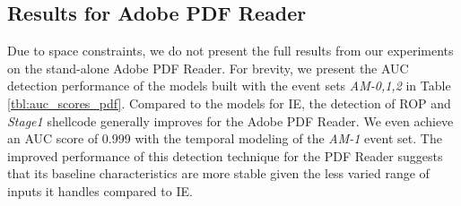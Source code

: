 \documentclass{acm_proc_article-sp}
\begin{document}
\iffalse
	\begin{figure}
	  \centering
\caption{Detection overhead in terms of IPC over different sampling granularity.}
	  \label{fig:detection_overhead}
	\end{figure}
	
	\textbf{Online detection overhead} \space\space To assess the overhead incurred by the online classification and detection of the stream of event measurements over varying sampling rates, we measure the Instructions Per Cycle (IPC) of the prototype component that performs the online classification of the measurements. From Figure \ref{fig:detection_overhead}, we observe that finer-grained sampling rates reduces the IPC of the classification code execution. Furthermore, the online classification using the temporal model shows a lower performance in terms of IPC, compared to that using the na\"{i}ve approach.
	
	\fi 


\subsection{Results for Adobe PDF Reader}
Due to space constraints, we do not present the full results from our
experiments on the stand-alone Adobe PDF Reader. For brevity, we 
present the AUC detection performance of the models built with the 
event sets \textit{AM-0,1,2} in Table \ref{tbl:auc_scores_pdf}. 
Compared to the models for IE, the detection of ROP and \textit{Stage1} 
shellcode generally improves for the Adobe PDF Reader. We even achieve 
an AUC score of 0.999 with the temporal modeling of the \textit{AM-1} 
event set.  The improved performance of this detection technique for 
the PDF Reader suggests that its baseline characteristics are more 
stable given the less varied range of inputs it handles compared to IE.


\begin{table}
\caption{AUC scores for stand-alone Adobe PDF Reader.}
\label{tbl:auc_scores_pdf}
\end{table}
\end{document}
